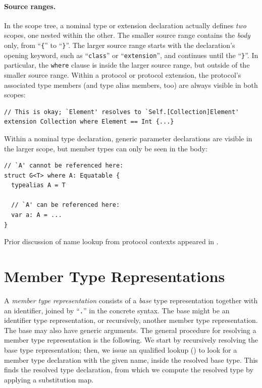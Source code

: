 \documentclass[../generics]{subfiles}
\begin{document}
\paragraph{Source ranges.}
In the scope tree, a nominal type or extension declaration actually defines \emph{two} scopes, one nested within the other. The smaller source range contains the \emph{body} only, from ``\verb|{|'' to ``\verb|}|''. The larger source range starts with the declaration's opening keyword, such as ``\texttt{class}'' or ``\texttt{extension}'', and continues until the ``\verb|}|''. In particular, the \texttt{where} clause is inside the larger source range, but outside of the smaller source range. Within a protocol or protocol extension, the protocol's associated type members (and type alias members, too) are always visible in both scopes:
\begin{Verbatim}
// This is okay; `Element' resolves to `Self.[Collection]Element'
extension Collection where Element == Int {...}
\end{Verbatim}
Within a nominal type declaration, generic parameter declarations are visible in the larger scope, but member types can only be seen in the body:
\begin{Verbatim}
// `A' cannot be referenced here:
struct G<T> where A: Equatable {
  typealias A = T

  // `A' can be referenced here:
  var a: A = ...
}
\end{Verbatim}
Prior discussion of name lookup from protocol contexts appeared in .

\section{Member Type Representations}\label{member type repr}

A \emph{member type representation} consists of a \emph{base} type representation together with an identifier, joined by ``\verb|.|'' in the concrete syntax. The base might be an identifier type representation, or recursively, another member type representation. The base may also have generic arguments. The general procedure for resolving a member type representation is the following. We start by recursively resolving the base type representation; then, we issue an qualified lookup () to look for a member type declaration with the given name, inside the resolved base type. This finds the resolved type declaration, from which we compute the resolved type by applying a substitution map.
\end{document}
